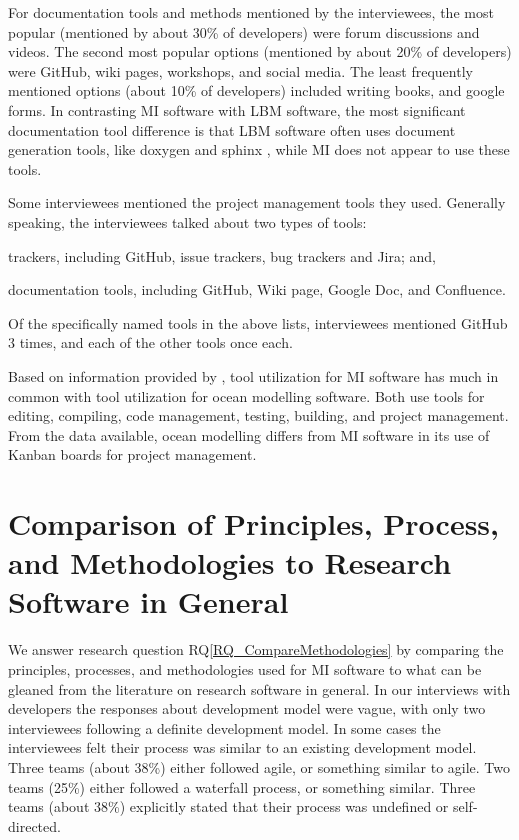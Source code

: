 \documentclass[final, 12pt, 3p, times]{elsarticle}
\newcommand{\rqref}[1]{RQ\ref{#1}}
\begin{document}
For documentation tools and methods mentioned by the interviewees, the most
popular (mentioned by about 30\% of developers) were forum discussions and
videos.  The second most popular options (mentioned by about 20\% of developers)
were GitHub, wiki pages, workshops, and social media. The least frequently
mentioned options (about 10\% of developers) included writing books, and google
forms.  In contrasting MI software with LBM software, the most significant
documentation tool difference is that LBM software often uses document
generation tools, like doxygen and sphinx \cite{Michalski2021}, while MI does
not appear to use these tools. 

Some interviewees mentioned the project management tools they used. Generally
speaking, the interviewees talked about two types of tools:
\begin{inparaenum}[i)]
\item trackers, including GitHub, issue trackers, bug trackers and Jira; and,
\item documentation tools, including GitHub, Wiki page, Google Doc, and
Confluence.
\end{inparaenum}
Of the specifically named tools in the above lists, interviewees mentioned
GitHub 3 times, and each of the other tools once each.

Based on information provided by \cite{JungEtAl2022}, tool utilization for MI
software has much in common with tool utilization for ocean modelling software.
Both use tools for editing, compiling, code management, testing, building, and
project management.  From the data available, ocean modelling differs from MI
software in its use of Kanban boards for project management.

\section[Comparison to Other Research Software]{Comparison of Principles, Process, and
Methodologies to Research Software in General} \label{Sec_CompareMethodologies}

We answer research question \rqref{RQ_CompareMethodologies} by comparing the
principles, processes, and methodologies used for MI software to what can be
gleaned from the literature on research software in general. In our interviews
with developers the responses about development model were vague, with only two
interviewees following a definite development model. In some cases the
interviewees felt their process was similar to an existing development model.
Three teams (about 38\%) either followed agile, or something similar to agile.
Two teams (25\%) either followed a waterfall process, or something similar.
Three teams (about 38\%) explicitly stated that their process was undefined or
self-directed.
\end{document}
